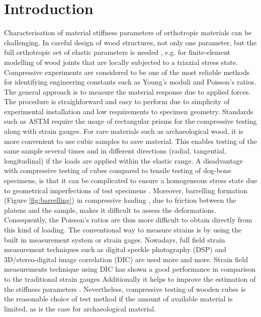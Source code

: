 \documentclass[review]{elsarticle}
\begin{document}
\linenumbers

\section{Introduction}

Characterisation of material stiffness parameters of orthotropic materials can
be challenging. In  careful design of wood structures, not only one parameter, but the full
orthotropic set of elastic parameters is needed \cite{tsoumis1991science},
e.g. for finite-element modelling of wood joints that are locally subjected to a
triaxial stress state. Compressive experiments are considered to be one of the most reliable methods for identifying engineering constants such as Young's moduli and Poisson's
ratios. The general approach is to measure the material response due to applied
forces. The procedure is straighforward and easy to perform due to simplicity of experimental installation and low requirements to specimen
geometry. Standards such as ASTM \cite{standard1997d143,
johnson1983compression} require the usage of rectangular prisms for
the compressive testing along with strain gauges.
For rare materials such as archaeological wood, it is more convenient to use
cubic samples \cite{ljungdahl2007transverse} to save material. 
This enables testing of the same sample several times and in
different directions (radial, tangential, longitudinal) if the loads are
applied within the elastic range.
A disadvantage with compressive testing of cubes compared to tensile testing of
dog-bone specimens, is that it can be complicated to ensure a homogeneous stress state
due to geometrical imperfections of test specimens \cite{Toftegaard1999849}.
Moreover, barrelling formation (Figure \ref{fig:barrelling}) in compressive
loading \cite{oldroyd1966stress}, due to friction between the platens and the
sample, makes it difficult to assess the  deformations.
Consequently, the Poisson's ratios are thus more difficult to obtain directly from this kind
of loading.
The conventional way to measure strains is by using the built in measurement
system or strain gages. Nowadays, full field strain measurement techniques such
as digital speckle photography (DSP) \cite{synnergren1999stereoscopic} and
3D/stereo-digital image correlation (DIC) \cite{majano2012test} are used more
and more. Strain field measurements technique using DIC has shown a good
performance in comparison to the traditional strain gauges
\cite{huang2010optical,xavier2012stereovision} Additionally it helps to
improve the estimation of the stiffness parameters \cite{dahl2009planar,
majano2012test, ozyhar2013moisture}. 
Nevertheless, compressive testing of wooden cubes is the reasonable 
choice of test method if the amount of available material is limited, as is the case for archaeological material.
\end{document}
